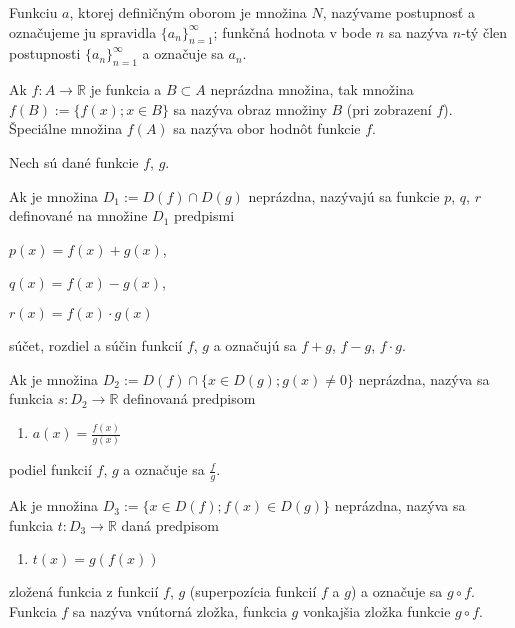 Funkciu $a$, ktorej definičným oborom je množina $N$, nazývame postupnosť a označujeme ju spravidla $\{a_n\}_{n=1}^\infty$; funkčná hodnota v bode $n$ sa nazýva $n$-tý člen postupnosti $\{a_n\}_{n=1}^\infty$ a označuje sa $a_n$.

Ak $f:A \rightarrow \mathbb{R}$ je funkcia a $B \subset A$ neprázdna množina, tak množina $f(B):=\{f(x);x\in B \}$ sa nazýva obraz množiny $B$ (pri zobrazení $f$). Špeciálne množina $f(A)$ sa nazýva obor hodnôt funkcie $f$.

Nech sú dané funkcie $f$, $g$.

\begin{enumerate}
\item Ak je množina $D_1:=D(f)\cap D(g)$ neprázdna, nazývajú sa funkcie $p$, $q$, $r$ definované na množine $D_1$ predpismi
\begin{center}
\item $p(x)=f(x)+g(x)$,
\item $q(x)=f(x)-g(x)$,
\item $r(x)=f(x)\cdot g(x)$
\end{center}
súčet, rozdiel a súčin funkcií $f$, $g$ a označujú sa $f+g$, $f-g$, $f\cdot g$.
\item Ak je množina $D_2:=D(f)\cap \{x\in D(g);g(x)\neq 0\}$ neprázdna, nazýva sa funkcia $s:D_2 \rightarrow \mathbb{R}$ definovaná predpisom 
\begin{enumerate}
\item $a(x)=\frac{f(x)}{g(x)}$
\end{enumerate}
podiel funkcií $f$, $g$ a označuje sa $\frac{f}{g}$.
\item Ak je množina $D_3:=\{x\in D(f);f(x)\in D(g)\}$ neprázdna, nazýva sa funkcia $t:D_3\rightarrow\mathbb{R}$ daná predpisom
\begin{enumerate}
\item $t(x)=g(f(x))$
\end{enumerate}
zložená funkcia z funkcií $f$, $g$ (superpozícia funkcií $f$ a $g$) a označuje sa $g \circ f$. Funkcia $f$ sa nazýva vnútorná zložka, funkcia $g$ vonkajšia zložka funkcie $g \circ f$.
\end{enumerate}

